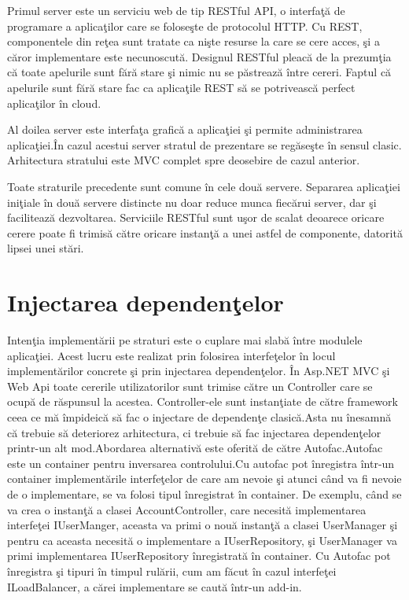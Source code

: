 \documentclass[a4paper,12pt]{report}
\begin{document}
Primul server este un serviciu web de tip RESTful API, o interfa\c t\u a de programare a aplica\c tilor care 
se folose\c ste de protocolul HTTP. Cu REST, componentele din re\c tea sunt tratate ca ni\c ste resurse
la care se cere acces, \c si a c\u aror implementare este necunoscut\u a. Designul RESTful pleac\u a 
de la prezum\c tia c\u a toate apelurile sunt f\u ar\u a stare \c si nimic nu se p\u astreaz\u a \^intre 
cereri. Faptul c\u a apelurile sunt f\u ar\u a stare fac ca aplica\c tile REST s\u a se potriveasc\u a
perfect aplica\c tilor \^in cloud.  

Al doilea server este interfa\c ta grafic\u a a aplica\c tiei \c si permite administrarea aplica\c tiei.\^In cazul 
acestui server stratul de prezentare se reg\u ase\c ste \^in sensul clasic. Arhitectura stratului este MVC complet spre
deosebire de cazul anterior.

Toate straturile precedente sunt comune \^in cele dou\u a servere.
Separarea aplica\c tiei ini\c tiale \^in dou\u a servere distincte nu doar reduce munca fiec\u arui server,
dar \c si faciliteaz\u a dezvoltarea. Serviciile RESTful sunt u\c sor de scalat deoarece oricare cerere poate fi 
trimis\u a c\u atre oricare instan\c t\u a a unei astfel de componente, datorit\u a lipsei unei st\u ari.

\section{Injectarea dependen\c telor}

Inten\c tia implement\u arii pe straturi este o cuplare mai slab\u a \^intre modulele aplica\c tiei. Acest lucru este 
realizat prin folosirea interfe\c telor \^in locul implement\u arilor concrete \c si prin injectarea dependen\c telor.
\^In Asp.NET MVC \c si Web Api toate cererile utilizatorilor sunt trimise c\u atre un Controller care se ocup\u a de
r\u aspunsul la acestea. Controller-ele sunt instan\c tiate de c\u atre framework ceea ce m\u a \^impideic\u a s\u a 
fac o injectare de dependen\c te clasic\u a.Asta nu \^inesamn\u a c\u a trebuie s\u a deteriorez  arhitectura, ci 
trebuie s\u a fac injectarea dependen\c telor printr-un alt mod.Abordarea alternativ\u a este oferit\u a de c\u atre 
Autofac.Autofac este un container pentru inversarea controlului.Cu autofac pot \^inregistra \^intr-un container 
implement\u arile interfe\c telor de care am nevoie \c si atunci c\^and va fi nevoie de o implementare, se va folosi tipul
\^inregistrat \^in container. De exemplu, c\^and se va crea o instan\c t\u a a clasei AccountController, care necesit\u a 
implementarea interfe\c tei IUserManger, aceasta va primi o nou\u a instan\c t\u a a clasei UserManager \c si pentru ca 
aceasta necesit\u a o implementare a IUserRepository, \c si UserManager va primi implementarea IUserRepository \^inregistrat\u a
\^in container. Cu Autofac pot \^inregistra \c si tipuri \^in timpul rul\u arii, cum am f\u acut \^in cazul interfe\c tei 
ILoadBalancer, a c\u arei implementare se caut\u a \^intr-un add-in.
\end{document}
